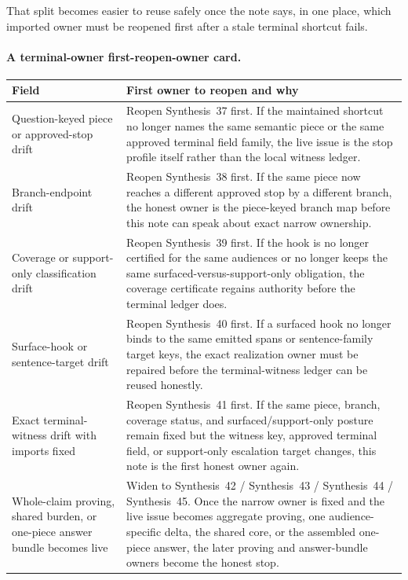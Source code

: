 \documentclass[11pt]{article}
\begin{document}
\noindent That split becomes easier to reuse safely once the note says, in one place, which imported owner must be reopened first after a stale terminal shortcut fails.

\paragraph{A terminal-owner first-reopen-owner card.}
\begin{table}[t]
\centering
\small
\begin{tabularx}{\linewidth}{@{}lX@{}}
\toprule
Field & First owner to reopen and why \\
\midrule
Question-keyed piece or approved-stop drift & Reopen Synthesis~37 first. If the maintained shortcut no longer names the same semantic piece or the same approved terminal field family, the live issue is the stop profile itself rather than the local witness ledger. \\
Branch-endpoint drift & Reopen Synthesis~38 first. If the same piece now reaches a different approved stop by a different branch, the honest owner is the piece-keyed branch map before this note can speak about exact narrow ownership. \\
Coverage or support-only classification drift & Reopen Synthesis~39 first. If the hook is no longer certified for the same audiences or no longer keeps the same surfaced-versus-support-only obligation, the coverage certificate regains authority before the terminal ledger does. \\
Surface-hook or sentence-target drift & Reopen Synthesis~40 first. If a surfaced hook no longer binds to the same emitted spans or sentence-family target keys, the exact realization owner must be repaired before the terminal-witness ledger can be reused honestly. \\
Exact terminal-witness drift with imports fixed & Reopen Synthesis~41 first. If the same piece, branch, coverage status, and surfaced/support-only posture remain fixed but the witness key, approved terminal field, or support-only escalation target changes, this note is the first honest owner again. \\
Whole-claim proving, shared burden, or one-piece answer bundle becomes live & Widen to Synthesis~42 / Synthesis~43 / Synthesis~44 / Synthesis~45. Once the narrow owner is fixed and the live issue becomes aggregate proving, one audience-specific delta, the shared core, or the assembled one-piece answer, the later proving and answer-bundle owners become the honest stop. \\

\end{tabularx}
\end{table}
\end{document}
